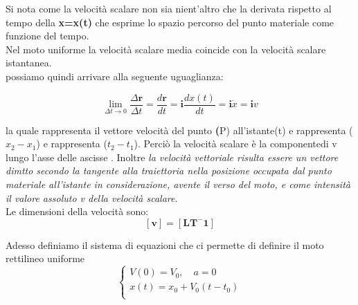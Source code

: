 \documentclass[a4paper,11pt,oneside]{book}
\theoremstyle{dispense}
\begin{document}
Si nota come la velocità scalare non sia nient'altro che la derivata rispetto al tempo della \textbf{x=x(t)} che esprime lo spazio percorso del punto materiale come funzione del tempo.\\
Nel moto uniforme la velocità scalare media coincide con la velocità scalare istantanea.\\

possiamo quindi arrivare alla seguente uguaglianza:\\
\begin{tcolorbox}
\[ \lim_{\Delta t \to 0} \frac{\Delta \mathbf{r}}{\Delta t} = \frac{d\mathbf{r}}{dt} = \mathbf{i} \frac{dx(t)}{dt} = \mathbf{i} \dot{x} = \mathbf{i} v
\]
\end{tcolorbox}
la quale rappresenta il vettore velocità del punto \textbf(P) all'istante(t) e   rappresenta ($x_2 - x_1$) e  rappresenta ($t_2-t_1$). Perciò la velocità scalare è la componentedi v lungo l'asse delle ascisse .
Inoltre \textit{la velocità vettoriale risulta essere un vettore dimtto secondo la tangente alla traiettoria nella posizione occupata dal punto materiale all'istante in considerazione, avente il verso del moto, e come intensità il valore assoluto v della velocità scalare}.\\

Le dimensioni della velocità sono:\\
\[
  \bm{[v]=[LT^-1]}
\]

Adesso definiamo il sistema di equazioni che ci permette di definire  il moto rettilineo uniforme
\begin{equation}
\begin{cases}
V(0)=V_0,   \quad  a=0\\
x(t)=x_0 + V_0(t-t_0)\\

\end{cases}
\end{equation}
\end{document}
